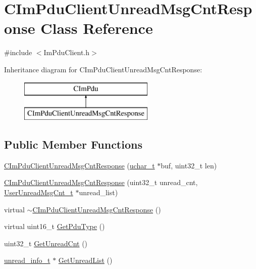 \hypertarget{class_c_im_pdu_client_unread_msg_cnt_response}{}\section{C\+Im\+Pdu\+Client\+Unread\+Msg\+Cnt\+Response Class Reference}
\label{class_c_im_pdu_client_unread_msg_cnt_response}


{\ttfamily \#include $<$Im\+Pdu\+Client.\+h$>$}

Inheritance diagram for C\+Im\+Pdu\+Client\+Unread\+Msg\+Cnt\+Response\+:\begin{figure}[H]
\begin{center}
\leavevmode
\includegraphics[height=2.000000cm]{class_c_im_pdu_client_unread_msg_cnt_response}
\end{center}
\end{figure}
\subsection*{Public Member Functions}
\begin{DoxyCompactItemize}
\item 
\hyperlink{class_c_im_pdu_client_unread_msg_cnt_response_af25e80f0f57af01652bebb1811946ffe}{C\+Im\+Pdu\+Client\+Unread\+Msg\+Cnt\+Response} (\hyperlink{base_2ostype_8h_a124ea0f8f4a23a0a286b5582137f0b8d}{uchar\+\_\+t} $\ast$buf, uint32\+\_\+t len)
\item 
\hyperlink{class_c_im_pdu_client_unread_msg_cnt_response_aa41a7ab2c4d35a5edee0468387b6890f}{C\+Im\+Pdu\+Client\+Unread\+Msg\+Cnt\+Response} (uint32\+\_\+t unread\+\_\+cnt, \hyperlink{struct_user_unread_msg_cnt__t}{User\+Unread\+Msg\+Cnt\+\_\+t} $\ast$unread\+\_\+list)
\item 
virtual \hyperlink{class_c_im_pdu_client_unread_msg_cnt_response_ad144773046528eb409cfbb05d29d0b26}{$\sim$\+C\+Im\+Pdu\+Client\+Unread\+Msg\+Cnt\+Response} ()
\item 
virtual uint16\+\_\+t \hyperlink{class_c_im_pdu_client_unread_msg_cnt_response_a658bf62eadeddee694595bbab2a99490}{Get\+Pdu\+Type} ()
\item 
uint32\+\_\+t \hyperlink{class_c_im_pdu_client_unread_msg_cnt_response_a68adbd14a44eb6f5fb42d6ccff70a959}{Get\+Unread\+Cnt} ()
\item 
\hyperlink{structunread__info__t}{unread\+\_\+info\+\_\+t} $\ast$ \hyperlink{class_c_im_pdu_client_unread_msg_cnt_response_a51731f1055eae800aa992c9683936d0f}{Get\+Unread\+List} ()
\end{DoxyCompactItemize}
